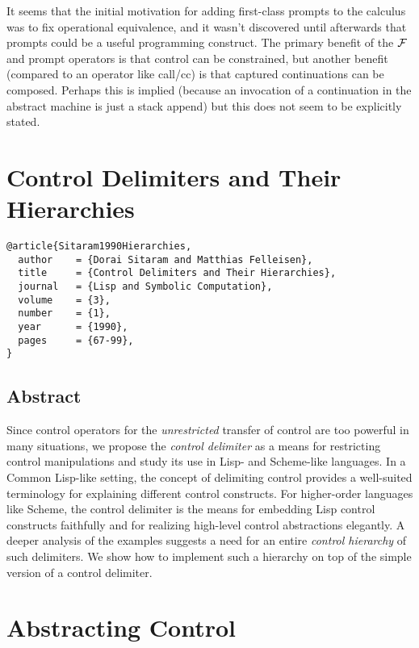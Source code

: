 \documentclass[letterpaper]{llncs}
\begin{document}
It seems that the initial motivation for adding first-class prompts to the calculus was to fix operational equivalence, and it wasn't discovered until afterwards that prompts could be a useful programming construct. The primary benefit of the $ \mathcal{F} $ and prompt operators is that control can be constrained, but another benefit (compared to an operator like call/cc) is that captured continuations can be composed. Perhaps this is implied (because an invocation of a continuation in the abstract machine is just a stack append) but this does not seem to be explicitly stated.






\section*{Control Delimiters and Their Hierarchies}%

\begin{verbatim}
@article{Sitaram1990Hierarchies,
  author    = {Dorai Sitaram and Matthias Felleisen},
  title     = {Control Delimiters and Their Hierarchies},
  journal   = {Lisp and Symbolic Computation},
  volume    = {3},
  number    = {1},
  year      = {1990},
  pages     = {67-99},
}
\end{verbatim}

\subsection*{Abstract}
Since control operators for the \textit{unrestricted} transfer of control are too powerful in many situations, we propose the \textit{control delimiter} as a means for restricting control manipulations and study its use in Lisp- and Scheme-like languages. In a Common Lisp-like setting, the concept of delimiting control provides a well-suited terminology for explaining different control constructs. For higher-order languages like Scheme, the control delimiter is the means for embedding Lisp control constructs faithfully and for realizing high-level control abstractions elegantly. A deeper analysis of the examples suggests a need for an entire \textit{control hierarchy} of such delimiters. We show how to implement such a hierarchy on top of the simple version of a control delimiter.





\section*{Abstracting Control}%
\end{document}
